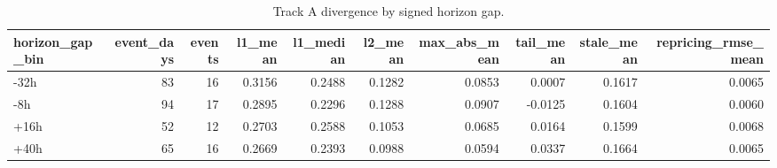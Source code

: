 \begin{table}
\caption{Track A divergence by signed horizon gap.}
\label{tab:trackA_divergence_by_gap}
\begin{tabular}{lrrrrrrrrr}
\toprule
horizon\_gap\_bin & event\_days & events & l1\_mean & l1\_median & l2\_mean & max\_abs\_mean & tail\_mean & stale\_mean & repricing\_rmse\_mean \\
\midrule
-32h & 83 & 16 & 0.3156 & 0.2488 & 0.1282 & 0.0853 & 0.0007 & 0.1617 & 0.0065 \\
-8h & 94 & 17 & 0.2895 & 0.2296 & 0.1288 & 0.0907 & -0.0125 & 0.1604 & 0.0060 \\
+16h & 52 & 12 & 0.2703 & 0.2588 & 0.1053 & 0.0685 & 0.0164 & 0.1599 & 0.0068 \\
+40h & 65 & 16 & 0.2669 & 0.2393 & 0.0988 & 0.0594 & 0.0337 & 0.1664 & 0.0065 \\
\bottomrule
\end{tabular}
\end{table}
